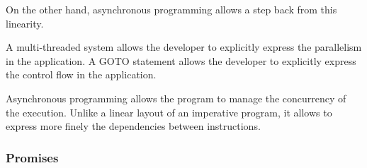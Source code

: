 On the other hand, asynchronous programming allows a step back from this linearity.


A multi-threaded system allows the developer to explicitly express the parallelism in the application.
A GOTO statement allows the developer to explicitly express the control flow in the application.


Asynchronous programming allows the program to manage the concurrency of the execution.
Unlike a linear layout of an imperative program, it allows to express more finely the dependencies between instructions.



\subsubsection{Promises}


